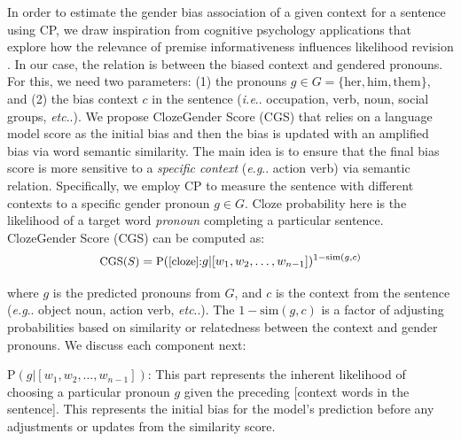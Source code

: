 \documentclass[11pt]{article}
\makeatletter
\def\eg{\emph{e.g}\onedot} \def\Eg{\emph{E.g}\onedot}
\def\ie{\emph{i.e}\onedot} \def\Ie{\emph{I.e}\onedot}
\def\etc{\emph{etc}\onedot} \def\vs{\emph{vs}\onedot}
\DeclareRobustCommand\ie{%
  \UKUS@comma{i.e}%
}
\DeclareRobustCommand\eg{%
  \UKUS@comma{e.g}%
}
\DeclareRobustCommand\onedot{\futurelet\@let@token\@onedot}
\def\@onedot{\ifx\@let@token.\else.\null\fi\xspace}
\DeclareRobustCommand\onedot{\futurelet\@let@token\@onedot}
\def\@onedot{\ifx\@let@token.\else.\null\fi\xspace}
\DeclareRobustCommand\onedot{\futurelet\@let@token\@onedot}
\def\@onedot{\ifx\@let@token.\else.\null\fi\xspace}
\def\eg{\emph{e.g}\onedot} \def\Eg{\emph{E.g}\onedot}
\def\ie{\emph{i.e}\onedot} \def\Ie{\emph{I.e}\onedot}
\def\etc{\emph{etc}\onedot} \def\vs{\emph{vs}\onedot}
\makeatother
\begin{document}
In order to estimate the gender bias association of a given context for a sentence using CP, we draw inspiration from cognitive psychology applications that explore how the relevance of premise informativeness influences likelihood revision \cite{blok2007induction}. In our case, the relation is between the biased context and gendered pronouns. For this, we need two parameters: (1) the pronouns \( g \in G = \{\text{her}, \text{him}, \text{them}\} \), and (2) the bias context $c$ in the sentence (\ie occupation, verb, noun, social groups, \etc). We propose ClozeGender Score (CGS) that relies on a language model score as the initial bias and then the bias is updated with an amplified bias via word semantic similarity. The main idea is to ensure that the final bias score is more sensitive to a \textit{specific context} (\eg action verb) via semantic relation. Specifically, we employ CP to measure the sentence with different contexts to a specific gender pronoun $g\in G$. Cloze probability here is the likelihood of a target word \textit{pronoun} completing a particular sentence. ClozeGender Score (CGS) can be computed as:
\begin{equation*}
\small
\text{CGS($S$)} = \text{P}(\text{[cloze]:} g  | [w_1, w_2, \ldots, w_{n-1}])^{1-\text{sim}(g, c)}
\end{equation*}


where $g$ is the predicted pronouns from $G$, and $c$ is the context from the sentence (\eg object noun, action verb, \etc).  The $1 - \text{sim}(g, c)$ is a factor of adjusting probabilities based on similarity or relatedness between the context and gender pronouns.  We discuss each component next:



 $\text{P}(g | [w_1, w_2, \ldots, w_{n-1}])$: This part represents the inherent likelihood of choosing a particular pronoun $g$ given the preceding [context words in the sentence]. This represents the initial bias for the model's prediction before any adjustments or updates from the similarity score.


\vspace{1.18pt}
\end{document}
